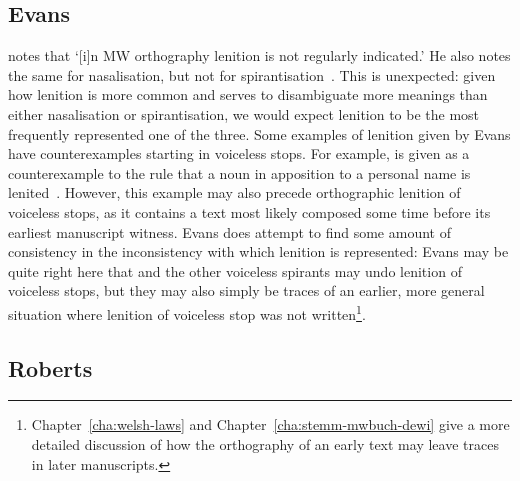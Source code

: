 \subsection{Evans}
\label{sec:evans}

\Textcite[\S 18]{evans_grammar_1964} notes that `[i]n MW orthography lenition is not regularly indicated.' He also notes the same for nasalisation, but not for spirantisation~\autocite[\S\S 24--25]{evans_grammar_1964}. This is unexpected: given how lenition is  more common and serves to disambiguate more meanings than either nasalisation or spirantisation, we would expect lenition to be the most frequently represented one of the three. Some examples of lenition given by Evans have counterexamples starting in voiceless stops. For example,  is given as a counterexample to the rule that a noun in apposition to a personal name is lenited~\autocite[\S 19]{evans_grammar_1964}. However, this example may also precede orthographic lenition of voiceless stops, as it contains a text most likely composed some time before its earliest manuscript witness. Evans does attempt to find some amount of consistency in the inconsistency with which lenition is represented:
Evans may be quite right here that  and the other voiceless spirants may undo lenition of voiceless stops, but they may also simply be traces of an earlier, more general situation where lenition of voiceless stop was not written\footnote{Chapter~\ref{cha:welsh-laws} and Chapter~\ref{cha:stemm-mwbuch-dewi} give a more detailed discussion of how the orthography of an early text may leave traces in later manuscripts.}.

\subsection{Roberts}
\label{sec:roberts}

